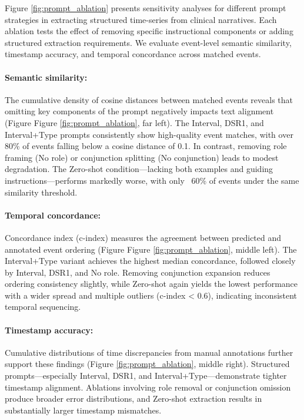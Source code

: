 Figure \ref{fig:prompt_ablation} presents sensitivity analyses for different prompt strategies in extracting structured time-series from clinical narratives. Each ablation tests the effect of removing specific instructional components or adding structured extraction requirements. We evaluate event-level semantic similarity, timestamp accuracy, and temporal concordance across matched events.

\paragraph{Semantic similarity:}
The cumulative density of cosine distances between matched events reveals that omitting key components of the prompt negatively impacts text alignment (Figure Figure \ref{fig:prompt_ablation}, far left). The Interval, DSR1, and Interval+Type prompts consistently show high-quality event matches, with over 80\% of events falling below a cosine distance of 0.1. In contrast, removing role framing (No role) or conjunction splitting (No conjunction) leads to modest degradation. The Zero-shot condition—lacking both examples and guiding instructions—performs markedly worse, with only ~60\% of events under the same similarity threshold.

\paragraph{Temporal concordance:} Concordance index (c-index) measures the agreement between predicted and annotated event ordering (Figure Figure \ref{fig:prompt_ablation}, middle left). The Interval+Type variant achieves the highest median concordance, followed closely by Interval, DSR1, and No role. Removing conjunction expansion reduces ordering consistency slightly, while Zero-shot again yields the lowest performance with a wider spread and multiple outliers (c-index < 0.6), indicating inconsistent temporal sequencing.

\paragraph{Timestamp accuracy:} Cumulative distributions of time discrepancies from manual annotations further support these findings (Figure \ref{fig:prompt_ablation}, middle right). Structured prompts—especially Interval, DSR1, and Interval+Type—demonstrate tighter timestamp alignment. Ablations involving role removal or conjunction omission produce broader error distributions, and Zero-shot extraction results in substantially larger timestamp mismatches.

